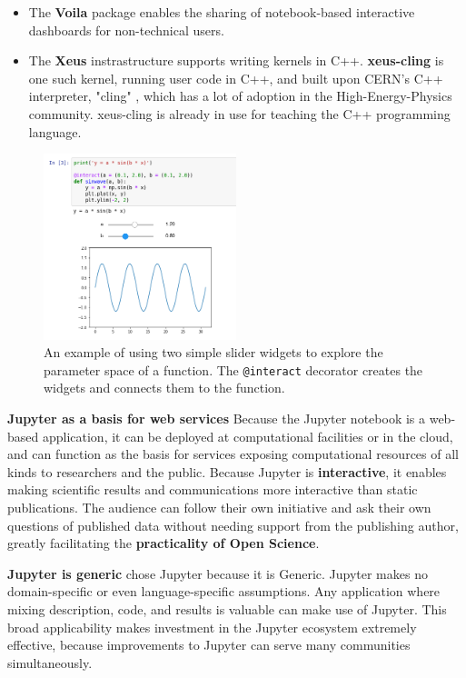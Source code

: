 \begin{itemize}
  \item The \textbf{Voila} package \cite{Voila} enables the
  sharing of notebook-based interactive dashboards for non-technical users.

  \item The \textbf{Xeus} instrastructure \cite{Corlay2017} supports writing kernels
  in C++. \textbf{xeus-cling} is one such kernel, running user code in C++,
  and built upon CERN's C++ interpreter, "cling" \cite{Vassilev2012},
  which has a lot of adoption in the High-Energy-Physics community.
  xeus-cling is already in use for teaching the C++ programming language.
\end{itemize}

\begin{figure}[ht]\centering
  \includegraphics[width=0.5\textwidth]{ipywidgets_example.png}
  \caption{An example of using two simple slider widgets to explore the
  parameter space of a function. The \texttt{@interact} decorator creates
  the widgets and connects them to the function.}
  \label{fig:ipywidgets-example}
\end{figure}

\textbf{Jupyter as a basis for web services}
Because the Jupyter notebook is a web-based application, it can be
deployed at computational facilities or in the cloud, and can function
as the basis for services exposing computational resources of all
kinds to researchers and the public.  Because Jupyter is
\textbf{interactive}, it enables making scientific results and
communications more interactive than static publications.  The
audience can follow their own initiative and ask their own questions
of published data without needing support from the publishing author,
greatly facilitating the \textbf{practicality of Open Science}.

\textbf{Jupyter is generic}
\TheProject chose Jupyter because it is
Generic.  Jupyter makes no domain-specific or even language-specific
assumptions.  Any application where mixing description, code, and
results is valuable can make use of Jupyter.  This broad applicability
makes investment in the Jupyter ecosystem extremely effective, because
improvements to Jupyter can serve many communities simultaneously.

